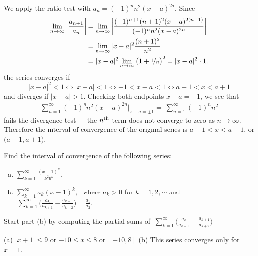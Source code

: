 \begin{solution}
We apply the ratio test with $a_n= (-1)^n n^2(x-a)^{2n}$.
Since
\begin{align*}
\lim_{n\to\infty} \bigg| \frac{a_{n+1}}{a_n} \bigg|
&= \lim_{n\to\infty} \bigg| \frac{(-1)^{n+1} (n+1)^2(x-a)^{2(n+1)}}
                                 {(-1)^n n^2(x-a)^{2n}} \bigg| \\
&= \lim_{n\to\infty} |x-a|^2 \frac{(n+1)^2}{n^2} \\
&= |x-a|^2 \lim_{n\to\infty} \big(1+\nicefrac{1}{n}\big)^2 = |x-a|^2\cdot1.
\end{align*}
the series converges if
\begin{equation*}
|x-a|^2<1
\iff |x-a|<1
\iff-1<x-a<1
\iff a-1<x<a+1
\end{equation*}
and diverges if $|x-a|>1$.
Checking both endpoints $x-a=\pm 1$, we see that
\begin{align*}
 \sum_{n=1}^\infty (-1)^n n^2(x-a)^{2n}\bigg|_{x-a=\pm 1}
=\ \sum_{n=1}^\infty (-1)^n n^2
\end{align*}
fails the divergence test --- the $n^{\rm th}$ term does not converge
to zero as $n\rightarrow\infty$. Therefore the interval of convergence
of the original series is  $a-1< x<a+1$,  or $\big(a-1,a+1\big)$.

\end{solution}




\begin{Mquestion}[2015A]
 Find the interval of convergence of the following series:
\begin{enumerate}[(a)]
\item
${\displaystyle \sum_{k=1}^\infty \frac{(x+1)^k}{k^2 9^k}}$.
\item
${\displaystyle \sum_{k=1}^\infty a_k(x-1)^k}$, \ where
$a_k>0$ for $k=1,2,\cdots$ and
$\ {\displaystyle \sum_{k=1}^\infty \Big(\frac{a_k}{a_{k+1}}
                         -\frac{a_{k+1}}{a_{k+2}}\Big)
   =\frac{a_1}{a_2} }$.
\end{enumerate}
\end{Mquestion}

\begin{hint}
Start part (b) by computing the partial sums of
$\ {\displaystyle \sum_{k=1}^\infty \Big(\frac{a_k}{a_{k+1}}
                         -\frac{a_{k+1}}{a_{k+2}}\Big)}$
\end{hint}

\begin{answer}
(a)  $|x+1|\le 9$ or $-10\le x\le 8$ or $[-10,8]$
\qquad (b) This series converges only for $x=1$.
\end{answer}


